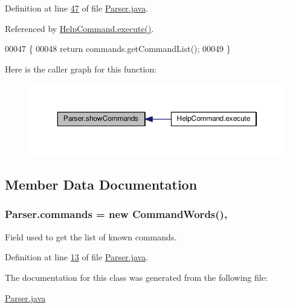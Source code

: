 Definition at line \hyperlink{Parser_8java_source_l00047}{47} of file \hyperlink{Parser_8java_source}{Parser.\-java}.



Referenced by \hyperlink{HelpCommand_8java_source_l00028}{Help\-Command.\-execute()}.


\begin{DoxyCode}
00047                                         \{
00048         \textcolor{keywordflow}{return} commands.getCommandList();
00049     \}
\end{DoxyCode}


Here is the caller graph for this function\-:
\nopagebreak
\begin{figure}[H]
\begin{center}
\leavevmode
\includegraphics[width=350pt]{classParser_a2510fee1c8d7298e222edaf1f34660dc_icgraph}
\end{center}
\end{figure}




\subsection{Member Data Documentation}
\hypertarget{classParser_a6afb99e1595e6bc0705a09ee00dbddd6}{
\subsubsection[{commands}]{ Parser.\-commands = new {\bf Command\-Words}()\hspace{0.3cm}{\ttfamily [static]}, {\ttfamily [private]}}}\label{classParser_a6afb99e1595e6bc0705a09ee00dbddd6}


Field used to get the list of known commands. 



Definition at line \hyperlink{Parser_8java_source_l00013}{13} of file \hyperlink{Parser_8java_source}{Parser.\-java}.



The documentation for this class was generated from the following file\-:\begin{DoxyCompactItemize}
\item 
\hyperlink{Parser_8java}{Parser.\-java}\end{DoxyCompactItemize}

